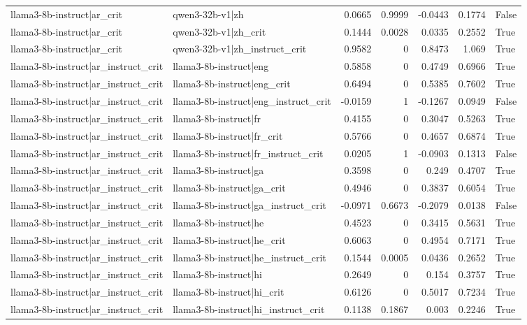 \begin{table}
\begin{tabular}{l l r r r r l}
llama3-8b-instruct|ar_crit & qwen3-32b-v1|zh & 0.0665 & 0.9999 & -0.0443 & 0.1774 & False \\
llama3-8b-instruct|ar_crit & qwen3-32b-v1|zh_crit & 0.1444 & 0.0028 & 0.0335 & 0.2552 & True \\
llama3-8b-instruct|ar_crit & qwen3-32b-v1|zh_instruct_crit & 0.9582 & 0 & 0.8473 & 1.069 & True \\
llama3-8b-instruct|ar_instruct_crit & llama3-8b-instruct|eng & 0.5858 & 0 & 0.4749 & 0.6966 & True \\
llama3-8b-instruct|ar_instruct_crit & llama3-8b-instruct|eng_crit & 0.6494 & 0 & 0.5385 & 0.7602 & True \\
llama3-8b-instruct|ar_instruct_crit & llama3-8b-instruct|eng_instruct_crit & -0.0159 & 1 & -0.1267 & 0.0949 & False \\
llama3-8b-instruct|ar_instruct_crit & llama3-8b-instruct|fr & 0.4155 & 0 & 0.3047 & 0.5263 & True \\
llama3-8b-instruct|ar_instruct_crit & llama3-8b-instruct|fr_crit & 0.5766 & 0 & 0.4657 & 0.6874 & True \\
llama3-8b-instruct|ar_instruct_crit & llama3-8b-instruct|fr_instruct_crit & 0.0205 & 1 & -0.0903 & 0.1313 & False \\
llama3-8b-instruct|ar_instruct_crit & llama3-8b-instruct|ga & 0.3598 & 0 & 0.249 & 0.4707 & True \\
llama3-8b-instruct|ar_instruct_crit & llama3-8b-instruct|ga_crit & 0.4946 & 0 & 0.3837 & 0.6054 & True \\
llama3-8b-instruct|ar_instruct_crit & llama3-8b-instruct|ga_instruct_crit & -0.0971 & 0.6673 & -0.2079 & 0.0138 & False \\
llama3-8b-instruct|ar_instruct_crit & llama3-8b-instruct|he & 0.4523 & 0 & 0.3415 & 0.5631 & True \\
llama3-8b-instruct|ar_instruct_crit & llama3-8b-instruct|he_crit & 0.6063 & 0 & 0.4954 & 0.7171 & True \\
llama3-8b-instruct|ar_instruct_crit & llama3-8b-instruct|he_instruct_crit & 0.1544 & 0.0005 & 0.0436 & 0.2652 & True \\
llama3-8b-instruct|ar_instruct_crit & llama3-8b-instruct|hi & 0.2649 & 0 & 0.154 & 0.3757 & True \\
llama3-8b-instruct|ar_instruct_crit & llama3-8b-instruct|hi_crit & 0.6126 & 0 & 0.5017 & 0.7234 & True \\
llama3-8b-instruct|ar_instruct_crit & llama3-8b-instruct|hi_instruct_crit & 0.1138 & 0.1867 & 0.003 & 0.2246 & True \\

\end{tabular}
\end{table}
